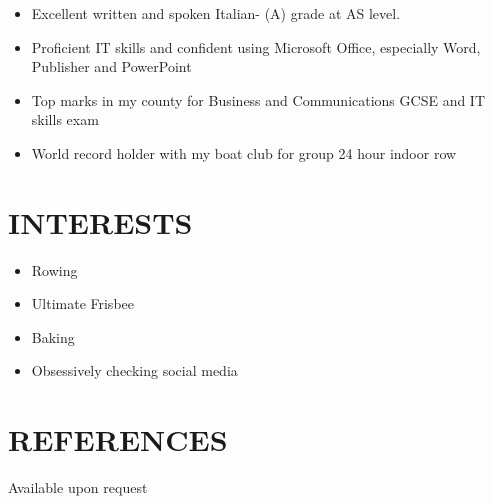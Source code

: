 \documentclass[]{friggeri-cv}
\begin{document}
\begin{itemize}
	\item Excellent written and spoken Italian- (A) grade at AS level. 
	\item Proficient IT skills and confident using Microsoft Office, especially Word, Publisher and PowerPoint
	\item Top marks in my county for Business and Communications GCSE and IT skills exam 
	\item World record holder with my boat club for group 24 hour indoor row
\end{itemize}

\section{INTERESTS}

\begin{itemize}
	\item Rowing
	\item Ultimate Frisbee
	\item Baking
	\item Obsessively checking social media
\end{itemize}

\section{REFERENCES}

Available upon request
\end{document}
